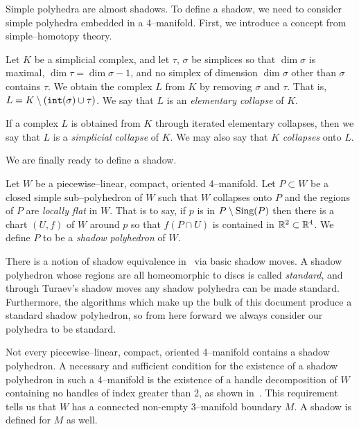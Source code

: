 Simple polyhedra are almost shadows.
To define a shadow, we need to consider simple polyhedra embedded in a 4--manifold.
First, we introduce a concept from simple--homotopy theory.

\begin{defn}
  Let $K$ be a simplicial complex, and let $\tau$, $\sigma$ be simplices so that $\dim \sigma$ is maximal, $\dim\tau=\dim \sigma -1$, and no simplex of dimension $\dim \sigma$ other than $\sigma$ contains $\tau$.
  We obtain the complex $L$ from $K$ by removing $\sigma$ and $\tau$.
  That is, $L= K\setminus(\mathtt{int}(\sigma)\cup\tau)$.
  We say that $L$ is an \emph{elementary collapse} of $K$.
  
  If a complex $L$ is obtained from $K$ through iterated elementary collapses, then we say that $L$ is a \emph{simplicial collapse} of $K$.
  We may also say that $K$ {\em collapses} onto $L$.   
\end{defn}

We are finally ready to define a shadow.

\begin{defn}
  Let $W$ be a piecewise--linear, compact, oriented 4--manifold.
  Let $P\subset W$ be a closed simple sub--polyhedron of $W$ such that $W$ collapses onto $P$ and the regions of $P$ are \emph{locally flat} in $W$.
  That is to say, if $p$ is in $P\setminus\textrm{Sing}(P)$ then there is a chart $(U,f)$ of $W$ around $p$ so that $f(P\cap U)$ is contained in $\mathbb{R}^2\subset \mathbb{R}^4$.
  We define $P$ to be a \emph{shadow polyhedron} of $W$.
\end{defn}

\begin{rmk}
  There is a notion of shadow equivalence in~\cite{Turaev91} via basic shadow moves.
  A shadow polyhedron whose regions are all homeomorphic to discs is called \emph{standard}, and through Turaev's shadow moves any shadow polyhedra can be made standard.
  Furthermore, the algorithms which make up the bulk of this document produce a standard shadow polyhedron, so from here forward we always consider our polyhedra to be standard.  
\end{rmk}

Not every piecewise--linear, compact, oriented 4--manifold contains a shadow polyhedron.
A necessary and sufficient condition for the existence of a shadow polyhedron in such a 4--manifold is the existence of a handle decomposition of $W$ containing no handles of index greater than 2, as shown in~\cite{Turaev91}.
This requirement tells us that $W$ has a connected non-empty 3--manifold boundary $M$.
A shadow is defined for $M$ as well.

